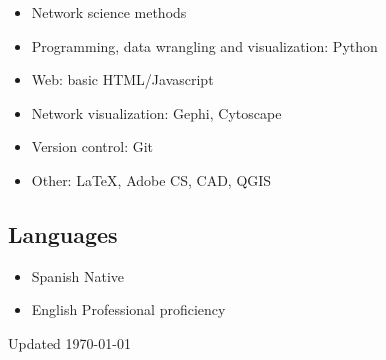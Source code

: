 \documentclass{academiccv}
\begin{document}
\begin{itemize}

\item Network science methods
\item Programming, data wrangling and visualization: Python
\item Web: basic HTML/Javascript
\item Network visualization: Gephi, Cytoscape
\item Version control: Git
\item Other: \LaTeX, Adobe CS, CAD, QGIS

\end{itemize}


\subsection*{Languages}

\begin{itemize}

\item Spanish \tab Native
\item English \tab Professional proficiency

\end{itemize}



\begin{center}
\vspace{6em}
Updated \monthyeardate\today
\end{center}
\end{document}
